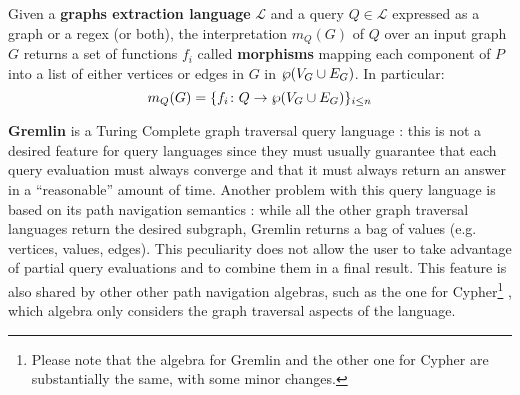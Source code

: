 \begin{definition}\label{sec:graphamatch}
	Given a \textbf{graphs extraction language} $\mathcal{L}$ and a query $Q\in\mathcal{L}$  expressed as a graph or a regex (or both),
	the interpretation $m_Q(G)$ of $Q$ over an input graph $G$ returns a set of functions
	$f_i$ called \textbf{morphisms}  mapping each component of $P$  into a list of either vertices or edges in $G$ in $\wp(V_G\cup E_G)$. In particular:
	\[m_Q(G)=\{f_i\colon Q\to  \wp(V_G\cup E_G)\}_{i\leq n}\]
	
\end{definition}

\textbf{Gremlin} is a Turing Complete graph traversal query language \cite{Rodriguez15}:
this is not a desired feature for query languages since they must usually  guarantee that
each query evaluation must always converge and that it must always return an answer in a ``reasonable'' amount of time. 
Another problem with this query language is based on its path navigation semantics \cite{ThakkarPAV17}:
while all the other graph traversal languages return the desired subgraph, Gremlin returns
a bag of values (e.g. vertices, values, edges). This peculiarity does not allow the user to take advantage
of partial query evaluations and to combine them in a final result. This feature is
also shared by other other path navigation algebras, such as the one for Cypher\footnote{Please note that the algebra \cite{ThakkarPAV17} for Gremlin and the other one \cite{Neo4jAlg,MartonSV17} for Cypher are substantially the same, with some minor changes.} \cite{Neo4jAlg,MartonSV17}, which algebra only considers  the graph traversal aspects of the language.

